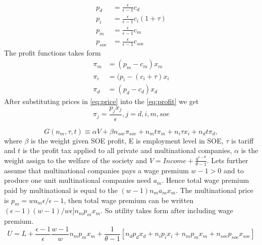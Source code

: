 \documentclass[xcolor=dvipsnames]{beamer}
\begin{document}
\begin{frame}
\begin{equation}\label{eq:price}
\begin{split}
p_d&=\frac{\epsilon}{\epsilon-1}c_d\\
p_i&=\frac{\epsilon}{\epsilon-1}c_i(1+\tau)\\
p_m&=\frac{\epsilon}{\epsilon-1}c_m\\
p_{soe}&=\frac{\epsilon}{\epsilon-1}c_{soe}
\end{split}
\end{equation} 
The profit functions takes form
\begin{equation}\label{eq:profit}
\begin{split}
\pi_m&=(p_m-c_m)x_m\\
\pi_i&=(p_i-(c_i+\tau)x_i\\
\pi_d&=(p_d-c_d)x_d
\end{split}
\end{equation}
After substituting prices in \ref{eq:price} into the \ref{eq:profit}
we get 
\begin{equation}\label{eq:maxprofit}
\pi_j=\frac{p_jx_j}{\epsilon}, j=d,i,m,soe
\end{equation}
\end{frame}

\begin{frame}
\begin{equation}
G(n_m,\tau,t)\equiv\alpha V+\beta n_{soe} \pi_{soe}+ n_mt\pi_m+n_i\tau x_i+n_dt\pi_d,
\end{equation}
where $ \beta $ is the weight given SOE profit, E is employment level in SOE,
$ \tau $ is tariff and $ t $ is the profit tax applied to all private and multinational companies, $ \alpha $ is the weight assign to the welfare of the society and $V=Income+\frac{q^{1-\theta}}{\theta-1}$. Lets further assume that multinational companies pays a wage premium $w-1>0$  and to produce one unit multinational companies need $a_m$. Hence total wage premium paid by multinational is equal to the $(w-1)n_ma_mx_m$. The multinational price is $p_m=wa_m\epsilon/\epsilon-1$, then total wage premium can be written $(\epsilon-1)(w-1)/w\epsilon]n_mp_mx_m$. So utility takes form after including wage premium.
\begin{equation}
U=L+\frac{\epsilon-1}{\epsilon}\frac{w-1}{w}n_mp_mx_m+\frac{1}{\theta-1}[n_dp_dx_d+n_ip_ix_i+n_mp_mx_m+n_{soe}p_{soe}x_{soe}]
\end{equation}
\end{frame}
\end{document}
